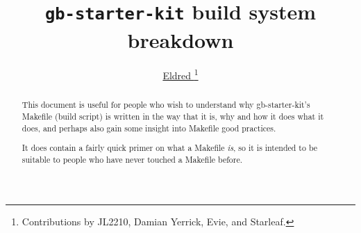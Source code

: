 \documentclass[12pt,a4paper]{article}
\author{\href{https://eldred.fr}{Eldred \bsc{Habert}}\thanks{Contributions by JL2210, Damian Yerrick, Evie, and Starleaf.}}
\title{\texttt{gb-starter-kit} build system breakdown}
\begin{document}
\maketitle
\renewcommand{\abstractname}{Summary and Intended Audience}
\begin{abstract}
	This document is useful for people who wish to understand why gb-starter-kit's Makefile (build script) is written in the way that it is, why and how it does what it does, and perhaps also gain some insight into Makefile good practices.

	It does contain a fairly quick primer on what a Makefile \emph{is}, so it is intended to be suitable to people who have never touched a Makefile before.
\end{abstract}
\tableofcontents

\pagebreak


\end{document}
